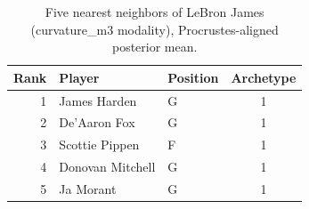 \begin{table}[htbp]
  \centering\small
  \begin{tabular}{rllc}
    \toprule
    Rank & Player & Position & Archetype \\
    \midrule
    1 & James Harden & G & 1 \\
    2 & De'Aaron Fox & G & 1 \\
    3 & Scottie Pippen & F & 1 \\
    4 & Donovan Mitchell & G & 1 \\
    5 & Ja Morant & G & 1 \\
    \bottomrule
  \end{tabular}
  \caption{Five nearest neighbors of LeBron James (curvature_m3 modality), Procrustes-aligned posterior mean.}
  \label{tab:LeBron_James_neighbors_curvature_m3}
\end{table}

